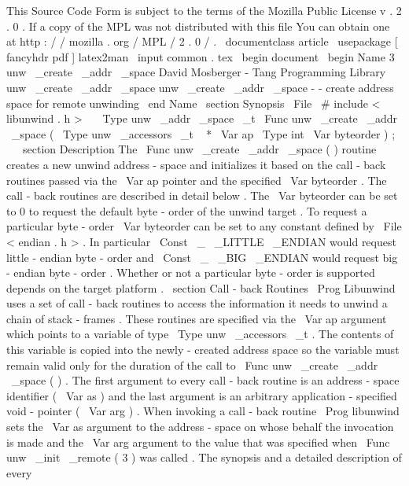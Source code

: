 %
This
Source
Code
Form
is
subject
to
the
terms
of
the
Mozilla
Public
%
License
v
.
2
.
0
.
If
a
copy
of
the
MPL
was
not
distributed
with
this
%
file
You
can
obtain
one
at
http
:
/
/
mozilla
.
org
/
MPL
/
2
.
0
/
.
\
documentclass
{
article
}
\
usepackage
[
fancyhdr
pdf
]
{
latex2man
}
\
input
{
common
.
tex
}
\
begin
{
document
}
\
begin
{
Name
}
{
3
}
{
unw
\
_create
\
_addr
\
_space
}
{
David
Mosberger
-
Tang
}
{
Programming
Library
}
{
unw
\
_create
\
_addr
\
_space
}
unw
\
_create
\
_addr
\
_space
-
-
create
address
space
for
remote
unwinding
\
end
{
Name
}
\
section
{
Synopsis
}
\
File
{
\
#
include
<
libunwind
.
h
>
}
\
\
\
Type
{
unw
\
_addr
\
_space
\
_t
}
\
Func
{
unw
\
_create
\
_addr
\
_space
}
(
\
Type
{
unw
\
_accessors
\
_t
~
*
}
\
Var
{
ap
}
\
Type
{
int
}
\
Var
{
byteorder
}
)
;
\
\
\
section
{
Description
}
The
\
Func
{
unw
\
_create
\
_addr
\
_space
}
(
)
routine
creates
a
new
unwind
address
-
space
and
initializes
it
based
on
the
call
-
back
routines
passed
via
the
\
Var
{
ap
}
pointer
and
the
specified
\
Var
{
byteorder
}
.
The
call
-
back
routines
are
described
in
detail
below
.
The
\
Var
{
byteorder
}
can
be
set
to
0
to
request
the
default
byte
-
order
of
the
unwind
target
.
To
request
a
particular
byte
-
order
\
Var
{
byteorder
}
can
be
set
to
any
constant
defined
by
\
File
{
<
endian
.
h
>
}
.
In
particular
\
Const
{
\
_
\
_LITTLE
\
_ENDIAN
}
would
request
little
-
endian
byte
-
order
and
\
Const
{
\
_
\
_BIG
\
_ENDIAN
}
would
request
big
-
endian
byte
-
order
.
Whether
or
not
a
particular
byte
-
order
is
supported
depends
on
the
target
platform
.
\
section
{
Call
-
back
Routines
}
\
Prog
{
Libunwind
}
uses
a
set
of
call
-
back
routines
to
access
the
information
it
needs
to
unwind
a
chain
of
stack
-
frames
.
These
routines
are
specified
via
the
\
Var
{
ap
}
argument
which
points
to
a
variable
of
type
\
Type
{
unw
\
_accessors
\
_t
}
.
The
contents
of
this
variable
is
copied
into
the
newly
-
created
address
space
so
the
variable
must
remain
valid
only
for
the
duration
of
the
call
to
\
Func
{
unw
\
_create
\
_addr
\
_space
}
(
)
.
The
first
argument
to
every
call
-
back
routine
is
an
address
-
space
identifier
(
\
Var
{
as
}
)
and
the
last
argument
is
an
arbitrary
application
-
specified
void
-
pointer
(
\
Var
{
arg
}
)
.
When
invoking
a
call
-
back
routine
\
Prog
{
libunwind
}
sets
the
\
Var
{
as
}
argument
to
the
address
-
space
on
whose
behalf
the
invocation
is
made
and
the
\
Var
{
arg
}
argument
to
the
value
that
was
specified
when
\
Func
{
unw
\
_init
\
_remote
}
(
3
)
was
called
.
The
synopsis
and
a
detailed
description
of
every
